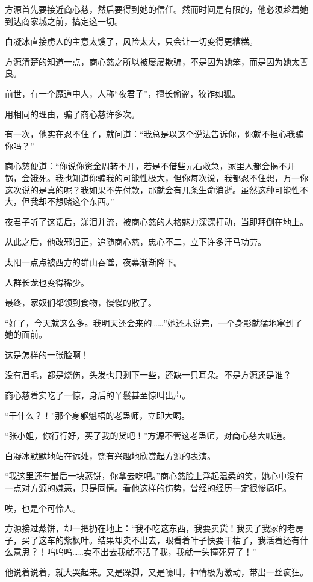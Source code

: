 \begin{this_body}
方源首先要接近商心慈，然后要得到她的信任。然而时间是有限的，他必须趁着她到达商家城之前，搞定这一切。

白凝冰直接虏人的主意太馊了，风险太大，只会让一切变得更糟糕。

方源清楚的知道一点，商心慈之所以被屡屡欺骗，不是因为她笨，而是因为她太善良。

前世，有一个魔道中人，人称“夜君子”，擅长偷盗，狡诈如狐。

用相同的理由，骗了商心慈许多次。

有一次，他实在忍不住了，就问道：“我总是以这个说法告诉你，你就不担心我骗你吗？”

商心慈便道：“你说你资金周转不开，若是不借些元石救急，家里人都会揭不开锅，会饿死。我也知道你骗我的可能性极大，但你每次说，我都忍不住想，万一你这次说的是真的呢？我如果不先付款，那就会有几条生命消逝。虽然这种可能性不大，但我却不想赌这个东西。”

夜君子听了这话后，涕泪并流，被商心慈的人格魅力深深打动，当即拜倒在地上。

从此之后，他改邪归正，追随商心慈，忠心不二，立下许多汗马功劳。

太阳一点点被西方的群山吞噬，夜幕渐渐降下。

人群长龙也变得稀少。

最终，家奴们都领到食物，慢慢的散了。

“好了，今天就这么多。我明天还会来的……”她还未说完，一个身影就猛地窜到了她的面前。

这是怎样的一张脸啊！

没有眉毛，都是烧伤，头发也只剩下一些，还缺一只耳朵。不是方源还是谁？

商心慈着实吃了一惊，身后的丫鬟甚至惊叫出声。

“干什么？！”那个身躯魁梧的老蛊师，立即大喝。

“张小姐，你行行好，买了我的货吧！”方源不管这老蛊师，对商心慈大喊道。

白凝冰默默地站在远处，饶有兴趣地欣赏起方源的表演。

“我这里还有最后一块蒸饼，你拿去吃吧。”商心慈脸上浮起温柔的笑，她心中没有一点对方源的嫌恶，只是同情。看他这样的伤势，曾经的经历一定很惨痛吧。

唉，也是个可怜人。

方源接过蒸饼，却一把扔在地上：“我不吃这东西，我要卖货！我卖了我家的老房子，买了这车的紫枫叶。结果却卖不出去，眼看着叶子快要干枯了，我活着还有什么意思？！呜呜呜……卖不出去我就不活了我，我就一头撞死算了！”

他说着说着，就大哭起来。又是跺脚，又是嚎叫，神情极为激动，带出一丝疯狂。


\end{this_body}
